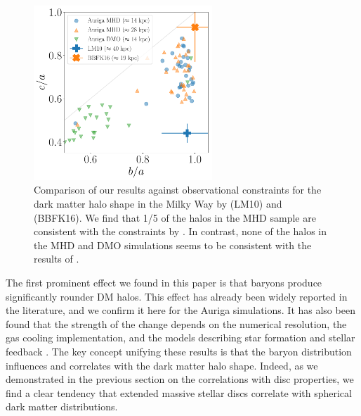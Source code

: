 \documentclass[usenatbib]{mnras}
\begin{document}
\begin{figure}
\begin{center}
\includegraphics[width=0.6\textwidth]{triaxiality_observations.pdf}
\end{center}
\caption{Comparison of our results against 
observational constraints for the 
dark matter halo shape in the Milky Way by \citet{LM10} (LM10) and
\citet{Bovy16} (BBFK16).   
We find that 1/5 of the halos in the MHD  sample are consistent with
the constraints by \citet{Bovy16}.
In contrast, none of the halos in the MHD and DMO simulations seems to be
consistent with the results of \citet{LM10}.}
\label{fig:observations}
\end{figure}

The first prominent effect we found in this paper is that  baryons produce
significantly rounder DM halos. This effect has already been  widely 
reported in the literature, and we confirm it here for the Auriga simulations.
It has also been found that the strength of the change depends on the
numerical resolution, the gas cooling implementation, and the
models describing star formation and stellar feedback
\citep{Bailin05,Debattista08, Bryan13, Butsky16, Chua19, Artale19}.  
The key concept unifying these results is that the baryon distribution
influences and correlates with the dark matter halo shape. 
Indeed, as we demonstrated in the previous section on the correlations
with disc properties, we find a clear tendency that extended
massive stellar discs correlate with spherical dark matter
distributions.  

\end{document}
